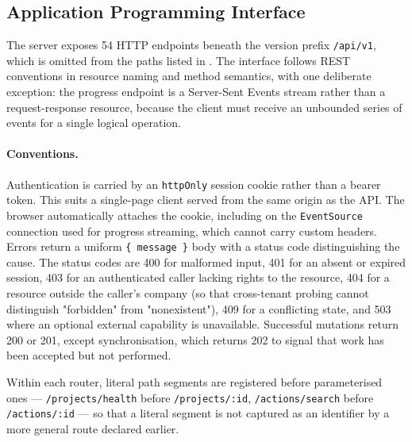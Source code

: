 \subsection{Application Programming Interface}
\label{subsec:api-surface}

The server exposes 54 HTTP endpoints beneath the version prefix
\texttt{/api/v1}, which is omitted from the paths listed in
. The interface follows REST conventions in resource
naming and method semantics, with one deliberate exception: the progress endpoint
is a Server-Sent Events stream rather than a request-response resource, because
the client must receive an unbounded series of events for a single logical
operation.

\paragraph{Conventions.}
Authentication is carried by an \texttt{httpOnly} session cookie rather than a
bearer token. This suits a single-page client served from the same origin as the
API. The browser automatically attaches the cookie, including on the
\texttt{EventSource} connection used for progress streaming, which cannot carry
custom headers. Errors return a uniform \texttt{\{ message \}} body with a status
code distinguishing the cause. The status codes are 400 for malformed input, 401 for an absent or
expired session, 403 for an authenticated caller lacking rights to the resource,
404 for a resource outside the caller's company (so that cross-tenant probing
cannot distinguish "forbidden" from "nonexistent"), 409 for a conflicting state,
and 503 where an optional external capability is unavailable. Successful
mutations return 200 or 201, except synchronisation, which returns 202 to signal
that work has been accepted but not performed.

Within each router, literal path segments are registered before parameterised
ones --- \texttt{/projects/health} before \texttt{/projects/:id},
\texttt{/actions/search} before \texttt{/actions/:id} --- so that a literal
segment is not captured as an identifier by a more general route declared
earlier.

